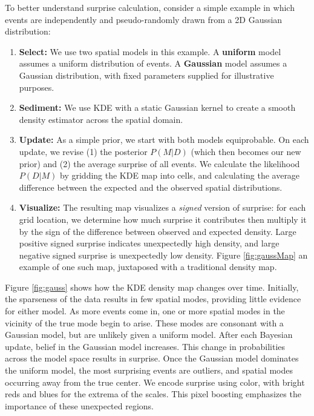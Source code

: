 \documentclass[journal]{vgtc}                %
\begin{document}
To better understand surprise calculation, consider a simple example in which events are independently and pseudo-randomly drawn from a 2D Gaussian distribution:

\begin{enumerate}
  \item \textbf{Select:} We use two spatial models in this example. A \textbf{uniform} model assumes a uniform distribution of events. A \textbf{Gaussian} model assumes a Gaussian distribution, with fixed parameters supplied for illustrative purposes.
  \item \textbf{Sediment:} We use KDE with a static Gaussian kernel to create a smooth density estimator across the spatial domain.
  \item \textbf{Update:} As a simple prior, we start with both models equiprobable. On each update, we revise (1) the posterior $P(M|D)$ (which then becomes our new prior) and (2) the average surprise of all events. We calculate the likelihood $P(D|M)$ by gridding the KDE map into cells, and calculating the average difference between the expected and the observed spatial distributions.
  \item \textbf{Visualize:} The resulting map visualizes a \emph{signed} version of surprise: for each grid location, we determine how much surprise it contributes then multiply it by the sign of the difference between observed and expected density. Large positive signed surprise indicates unexpectedly high density, and large negative signed surprise is unexpectedly low density. Figure \ref{fig:gaussMap} an example of one such map, juxtaposed with a traditional density map.
\end{enumerate}

Figure \ref{fig:gauss} shows how the KDE density map changes over time. Initially, the sparseness of the data results in few spatial modes, providing little evidence for either model. As more events come in, one or more spatial modes in the vicinity of the true mode begin to arise. These modes are consonant with a Gaussian model, but are unlikely given a uniform model. After each Bayesian update, belief in the Gaussian model increases. This change in probabilities across the model space results in surprise. Once the Gaussian model dominates the uniform model, the most surprising events are outliers, and spatial modes occurring away from the true center. We encode surprise using color, with bright reds and blues for the extrema of the scales. This pixel boosting \cite{oelke2011visual} emphasizes the importance of these unexpected regions.
\end{document}
